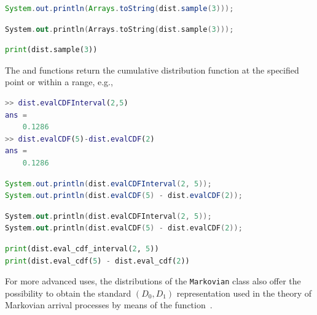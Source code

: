 \begin{JAVA}
\begin{lstlisting}[language=java, basicstyle=\ttfamily\scriptsize]
System.out.println(Arrays.toString(dist.sample(3)));
\end{lstlisting}
\end{JAVA}
\begin{KOTLIN}
\begin{lstlisting}[language=kotlin, basicstyle=\ttfamily\scriptsize]
System.out.println(Arrays.toString(dist.sample(3)));
\end{lstlisting}
\end{KOTLIN}
\begin{PYTHON}
\begin{lstlisting}[language=python]
print(dist.sample(3))
\end{lstlisting}
\end{PYTHON}
The  and  functions return the cumulative distribution function at the specified point or within a range, e.g.,
\begin{MATLAB}    
\begin{lstlisting}[language = matlab]
>> dist.evalCDFInterval(2,5)
ans =
    0.1286
>> dist.evalCDF(5)-dist.evalCDF(2)
ans =
    0.1286
\end{lstlisting}
\end{MATLAB}
\begin{JAVA}
\begin{lstlisting}[language=java, basicstyle=\ttfamily\scriptsize]
System.out.println(dist.evalCDFInterval(2, 5));
System.out.println(dist.evalCDF(5) - dist.evalCDF(2));
\end{lstlisting}
\end{JAVA}
\begin{KOTLIN}
\begin{lstlisting}[language=kotlin, basicstyle=\ttfamily\scriptsize]
System.out.println(dist.evalCDFInterval(2, 5));
System.out.println(dist.evalCDF(5) - dist.evalCDF(2));
\end{lstlisting}
\end{KOTLIN}
\begin{PYTHON}
\begin{lstlisting}[language=python]
print(dist.eval_cdf_interval(2, 5))
print(dist.eval_cdf(5) - dist.eval_cdf(2))
\end{lstlisting}
\end{PYTHON}
For more advanced uses, the distributions of the \texttt{Markovian} class also offer the possibility to obtain the standard $(D_0,D_1)$ representation used in the theory of Markovian arrival processes by means of the  function~\cite{BolGMT06}. 

